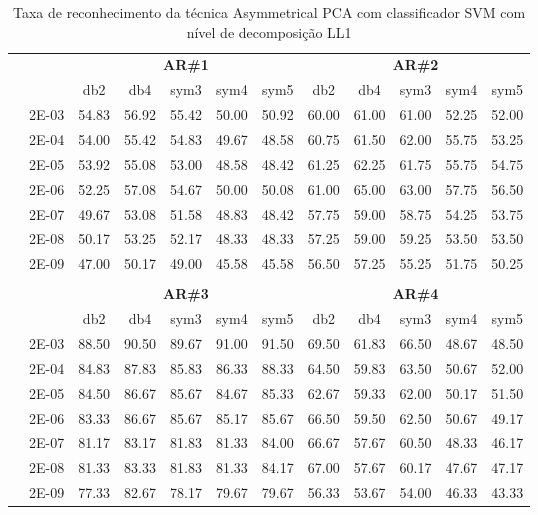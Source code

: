 \begin{table}[H]
	\centering
    \normalsize
	\caption{Taxa de reconhecimento da técnica Asymmetrical PCA com classificador SVM com nível de decomposição LL1}
	\begin{tabular}{|c|c|c c c c c|c c c c c|}
\cline{3-12}
\multicolumn{2}{c|}{\multirow{2}{*}{}} & \multicolumn{5}{c|}{\textbf{AR\#1}}  & \multicolumn{5}{c|}{\textbf{AR\#2}} \\\cline{3-12}

\multicolumn{2}{c|}{}  & db2 & db4 & sym3 & sym4 & sym5 & db2 & db4& sym3 & sym4 & sym5 \\\hline
\multicolumn{1}{|c|}{ \multirow{6}{*}{\rotatebox[origin=c]{90}{\textbf{Gamma}}} }
&2E-03&	54.83&	56.92&	55.42&	50.00&	50.92&	60.00&	61.00&	61.00&	52.25&	52.00	\\\cline{2-12}
&2E-04&	54.00&	55.42&	54.83&	49.67&	48.58&	60.75&	61.50&	62.00&	55.75&	53.25	\\\cline{2-12}
&2E-05&	53.92&	55.08&	53.00&	48.58&	48.42&	61.25&	62.25&	61.75&	55.75&	54.75	\\\cline{2-12}
&2E-06&	52.25&	57.08&	54.67&	50.00&	50.08&	61.00&	65.00&	63.00&	57.75&	56.50	\\\cline{2-12}
&2E-07&	49.67&	53.08&	51.58&	48.83&	48.42&	57.75&	59.00&	58.75&	54.25&	53.75	\\\cline{2-12}
&2E-08&	50.17&	53.25&	52.17&	48.33&	48.33&	57.25&	59.00&	59.25&	53.50&	53.50	\\\cline{2-12}
&2E-09&	47.00&	50.17&	49.00&	45.58&	45.58&	56.50&	57.25&	55.25&	51.75&	50.25	


\\ \midrule
\multicolumn{12}{c}{}\\ 

\cline{3-12}
\multicolumn{2}{c}{} & \multicolumn{5}{|c|}{\textbf{AR\#3}}  & \multicolumn{5}{c|}{\textbf{AR\#4}} \\\cline{3-12}
\multicolumn{2}{c}{}  & \multicolumn{1}{|c}{db2} & db4 & sym3 & sym4 & sym5 & db2 & db4& sym3 & sym4 & sym5 \\\hline
\multicolumn{1}{|c|}{ \multirow{6}{*}{\rotatebox[origin=c]{90}{\textbf{Gamma}}} }
&2E-03&	88.50&	90.50&	89.67&	91.00&	91.50&	69.50&	61.83&	66.50&	48.67&	48.50	\\\cline{2-12}
&2E-04&	84.83&	87.83&	85.83&	86.33&	88.33&	64.50&	59.83&	63.50&	50.67&	52.00	\\\cline{2-12}
&2E-05&	84.50&	86.67&	85.67&	84.67&	85.33&	62.67&	59.33&	62.00&	50.17&	51.50	\\\cline{2-12}
&2E-06&	83.33&	86.67&	85.67&	85.17&	85.67&	66.50&	59.50&	62.50&	50.67&	49.17	\\\cline{2-12}
&2E-07&	81.17&	83.17&	81.83&	81.33&	84.00&	66.67&	57.67&	60.50&	48.33&	46.17	\\\cline{2-12}
&2E-08&	81.33&	83.33&	81.83&	81.33&	84.17&	67.00&	57.67&	60.17&	47.67&	47.17	\\\cline{2-12}
&2E-09&	77.33&	82.67&	78.17&	79.67&	79.67&	56.33&	53.67&	54.00&	46.33&	43.33	
	
		
\\\midrule
\end{tabular}

\end{table}



